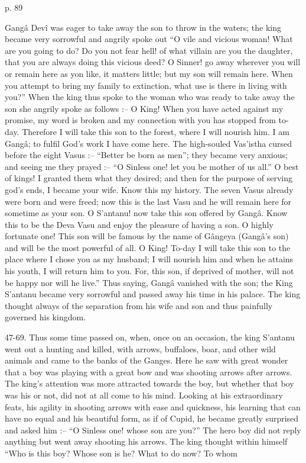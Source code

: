  

p. 89

 

Gangâ Devî was eager to take away the son to throw in the waters; the king became very sorrowful and angrily spoke out “O vile and vicious woman! What are you going to do? Do you not fear hell! of what villain are you the daughter, that you are always doing this vicious deed? O Sinner! go away wherever you will or remain here as yon like, it matters little; but my son will remain here. When you attempt to bring my family to extinction, what use is there in living with you?” When the king thus spoke to the woman who was ready to take away the son she angrily spoke as follows :-- O King! When you have acted against my promise, my word is broken and my connection with you has stopped from to-day. Therefore I will take this son to the forest, where I will nourish him. I am Gangâ; to fulfil God's work I have come here. The high-souled Vas'istha cursed before the eight Vasus :-- “Better be born as men”; they became very anxious; and seeing me they prayed :-- “O Sinless one! let you be mother of us all.” O best of kings! I granted them what they desired; and then for the purpose of serving god's ends, I became your wife. Know this my history. The seven Vasus already were born and were freed; now this is the last Vasu and he will remain here for sometime as your son. O S’antanu! now take this son offered by Gangâ. Know this to be the Deva Vasu and enjoy the pleasure of having a son. O highly fortunate one! This son will be famous by the name of Gângeya (Gangâ's son) and will be the most powerful of all. O King! To-day I will take this son to the place where I chose you as my husband; I will nourish him and when he attains his youth, I will return him to you. For, this son, if deprived of mother, will not be happy nor will he live.” Thus saying, Gangâ vanished with the son; the King S’antanu became very sorrowful and passed away his time in his palace. The king thought always of the separation from his wife and son and thus painfully governed his kingdom.

 

47-69. Thus some time passed on, when, once on an occasion, the king S’antanu went out a hunting and killed, with arrows, buffaloes, boar, and other wild animals and came to the banks of the Ganges. Here he saw with great wonder that a boy was playing with a great bow and was shooting arrows after arrows. The king's attention was more attracted towards the boy, but whether that boy was his or not, did not at all come to his mind. Looking at his extraordinary feats, his agility in shooting arrows with ease and quickness, his learning that can have no equal and his beautiful form, as if of Cupid, he became greatly surprised and asked him :-- “O Sinless one! whose son are you?” The hero boy did not reply anything but went away shooting his arrows. The king thought within himself “Who is this boy? Whose son is he? What to do now? To whom

